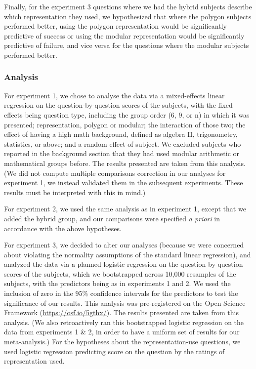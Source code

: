 \documentclass[man,10pt]{apa6}
\begin{document}
Finally, for the experiment 3 questions where we had the hybrid subjects describe which representation they used, we hypothesized that where the polygon subjects performed better, using the polygon representation would be significantly predictive of success or using the modular representation would be significantly predictive of failure, and vice versa for the questions where the modular subjects performed better.
\subsubsection{Analysis}
For experiment 1, we chose to analyse the data via a mixed-effects linear regression on the question-by-question scores of the subjects, with the fixed effects being question type, including the group order (6, 9, or n) in which it was presented; representation, polygon or modular; the interaction of those two; the effect of having a high math background, defined as algebra II, trigonometry, statistics, or above; and a random effect of subject. We excluded subjects who reported in the background section that they had used modular arithmetic or mathematical groups before. The results presented are taken from this analysis. (We did not compute multiple comparisons correction in our analyses for experiment 1, we instead validated them in the subsequent experiments. These results must be interpreted with this in mind.) \par 
For experiment 2, we used the same analysis as in experiment 1, except that we added the hybrid group, and our comparisons were specified \textit{a priori} in accordance with the above hypotheses.\par
For experiment 3, we decided to alter our analyses (because we were concerned about violating the normality assumptions of the standard linear regression), and analyzed the data via a planned logistic regression on the question-by-question scores of the subjects, which we bootstrapped across 10,000 resamples of the subjects, with the predictors being as in experiments 1 and 2. We used the inclusion of zero in the 95\% confidence intervals for the predictors to test the significance of our results. This analysis was pre-registered on the Open Science Framework (\url{https://osf.io/5gthx/}). The results presented are taken from this analysis. (We also retroactively ran this bootstrapped logistic regression on the data from experiments 1 \& 2, in order to have a uniform set of results for our meta-analysis.) For the hypotheses about the representation-use questions, we used logistic regression predicting score on the question by the ratings of representation used.
\end{document}
